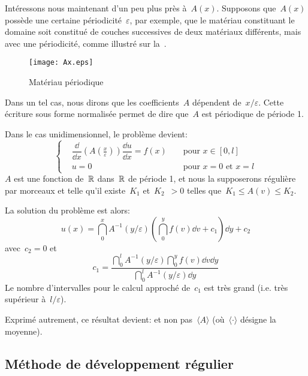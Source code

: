 \medskip
Intéressons nous maintenant d'un peu plus près à~$A(x)$.
Supposons que~$A(x)$ possède une certaine périodicité~$\varepsilon$, par exemple, que le matériau constituant le domaine soit constitué de couches successives de deux matériaux différents, mais avec une périodicité, comme illustré sur la~.
\begin{figure}[ht]
\centering\texttt{[image: Ax.eps]}
\caption{Matériau périodique}\label{Fig-Ax}
\end{figure}
Dans un tel cas, nous dirons que les coefficients~$A$ dépendent de~$x/\varepsilon$. Cette écriture sous forme normalisée permet de dire que~$A$ est périodique de période 1.

\medskip
Dans le cas unidimensionnel, le problème devient:
\begin{equation}
\left\{
\begin{aligned}
&\dfrac \dd{\dd x}\left(A\left(\frac x\varepsilon\right)\right) \dfrac{\dd u}{\dd x} = f(x)&& \text{ pour } x\in[0,l]\\
&u=0 &&\text{ pour } x=0 \text{ et } x=l
\end{aligned}
\right.
\end{equation}
$A$ est une fonction de~$\mathbb R$ dans~$\mathbb R$ de période 1, et nous la supposerons régulière par morceaux et telle qu'il existe~$K_1$ et~$K_2$~$>0$ telles que~$K_1\le A(v)\le K_2$.

\medskip
La solution du problème est alors:
\begin{equation}
u(x)=\dint_0^x A^{-1}(y/\varepsilon) \left(\dint_0^y f(v)\dd v + c_1 \right) \dd y + c_2
\end{equation}
avec~$c_2=0$ et
\begin{equation} c_1 = \dfrac{\dint_0^l A^{-1}(y/\varepsilon)\dint_0^y f(v)\dd v \dd y}{\dint_0^l A^{-1}(y/\varepsilon)\dd y} \end{equation}
Le nombre d'intervalles pour le calcul approché de~$c_1$ est très grand (i.e. très supérieur à~$l/\varepsilon$).

Exprimé autrement, ce résultat devient:  et non pas~$\langle A\rangle$ (où~$\langle\cdot\rangle$ désigne la moyenne).


\medskip
\subsection{Méthode de développement régulier}

